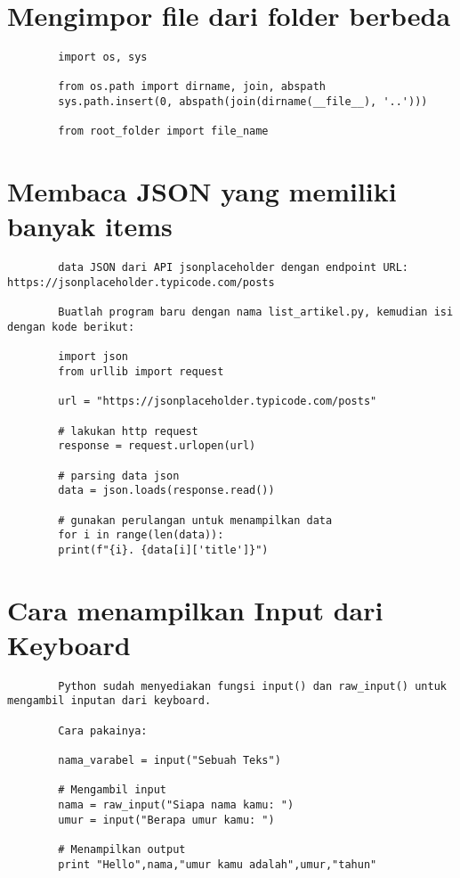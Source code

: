 \documentclass{article}
\begin{document}
	\section{Mengimpor file dari folder berbeda}
	\begin{lstlisting}
		import os, sys
		
		from os.path import dirname, join, abspath
		sys.path.insert(0, abspath(join(dirname(__file__), '..')))
		
		from root_folder import file_name
	\end{lstlisting}
	
	\section{Membaca JSON yang memiliki banyak items}
	\begin{lstlisting}
		data JSON dari API jsonplaceholder dengan endpoint URL: https://jsonplaceholder.typicode.com/posts
		
		Buatlah program baru dengan nama list_artikel.py, kemudian isi dengan kode berikut:
		
		import json
		from urllib import request
		
		url = "https://jsonplaceholder.typicode.com/posts"
		
		# lakukan http request
		response = request.urlopen(url)
		
		# parsing data json
		data = json.loads(response.read())
		
		# gunakan perulangan untuk menampilkan data
		for i in range(len(data)):
		print(f"{i}. {data[i]['title']}")
	\end{lstlisting}
	
	\section{Cara menampilkan Input dari Keyboard}
	\begin{lstlisting}
		Python sudah menyediakan fungsi input() dan raw_input() untuk mengambil inputan dari keyboard.
		
		Cara pakainya:
		
		nama_varabel = input("Sebuah Teks")
		
		# Mengambil input
		nama = raw_input("Siapa nama kamu: ")
		umur = input("Berapa umur kamu: ")
		
		# Menampilkan output
		print "Hello",nama,"umur kamu adalah",umur,"tahun"
	\end{lstlisting}
	
\end{document}

